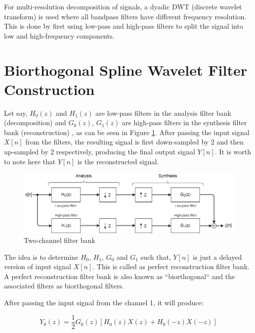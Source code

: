For multi-resolution decomposition of signals, a dyadic DWT (discrete wavelet transform) is used where all bandpass filters have different frequency resolution. This is done by first using low-pass and high-pass filters to split the signal into low and high-frequency components.

\section{Biorthogonal Spline Wavelet Filter Construction}
Let say, ${H_{0}(z)}$ and ${H_{1}(z)}$ are low-pass filters in the analysis filter bank (decomposition) and ${G_{0}(z)}$, ${G_{1}(z)}$ are high-pass filters in the synthesis filter bank (reconstruction) \cite{wang2001using}, as can be seen in Figure \ref{fig:2_channel_filter_bank}. After passing the input signal $X[n]$ from the filters, the resulting signal is first down-sampled by 2 and then up-sampled by 2  respectively, producing the final output signal $Y[n]$. It is worth to note here that $Y[n]$ is the reconstructed signal. 



\begin{figure}
	\centering
	\includegraphics[width=160mm]{images/2_channel_filter_bank}
	\caption{Two-channel filter bank}
	\label{fig:2_channel_filter_bank}
\end{figure}



The idea is to determine $H_0$, $H_1$, $G_0$ and $G_1$ such that, $Y[n]$ is just a delayed version of input signal $X[n]$. This is called as perfect reconstruction filter bank. A perfect reconstruction filter bank is also known as ``biorthogonal`` and the associated filters as biorthogonal filters. 

After passing the input signal from the channel 1, it will produce:

\begin{equation} \label{eqn_wavelet_transform}
{Y_{0}(z) = \frac{1}{2}G_{0}(z)[H_{0}(z)X(z) + H_{0}(-z)X(-z)]}
\end{equation}

